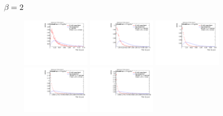 \subsubsection*{$\beta=2$}
\begin{figure}[H]
\includegraphics[width=0.3\textwidth]{sascha_input/Appendix/Distributions/w/distributions/beta2/h_assisted_tj_C2_2_bin1.pdf} \hspace{1mm}
\includegraphics[width=0.3\textwidth]{sascha_input/Appendix/Distributions/w/distributions/beta2/h_assisted_tj_C2_2_bin2.pdf} \hspace{1mm}
\includegraphics[width=0.3\textwidth]{sascha_input/Appendix/Distributions/w/distributions/beta2/h_assisted_tj_C2_2_bin3.pdf} 
\bigskip
\includegraphics[width=0.3\textwidth]{sascha_input/Appendix/Distributions/w/distributions/beta2/h_assisted_tj_C2_2_bin4.pdf} \hspace{1mm}
\includegraphics[width=0.3\textwidth]{sascha_input/Appendix/Distributions/w/distributions/beta2/h_assisted_tj_C2_2_bin5.pdf} \hspace{1mm}

\end{figure}
